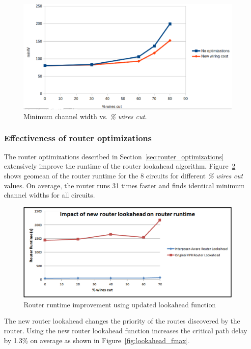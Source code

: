 \documentclass{sig-alternate-2013}
\begin{document}
\begin{figure}[!htbp]
\centering
\includegraphics[width=\linewidth]{comparison_minW.eps}
\caption{Minimum channel width vs. \textit{\% wires cut}.}
\label{fig:comparison_minW}
\end{figure}

\subsubsection{Effectiveness of router optimizations}
\label{sec:effectiveness_of_router_enhancements}
The router optimizations described in Section~\ref{sec:router_optimizations} extensively improve the runtime of the router lookahead algorithm. Figure~\ref{fig:lookahead_runtime} shows geomean of the router runtime for the 8 circuits for different \textit{\% wires cut} values. On average, the router runs 31 times faster and finds identical minimum channel widths for all circuits.

\begin{figure}[!hb]
\centering
\includegraphics[width=\linewidth]{router_opt.eps}
\caption{Router runtime improvement using updated lookahead function}
\label{fig:lookahead_runtime}
\end{figure}

The new router lookahead changes the priority of the routes discovered by the router. Using the new router lookahead function increases the critical path delay by 1.3\% on average as shown in Figure~\ref{fig:lookahead_fmax}.
\end{document}
